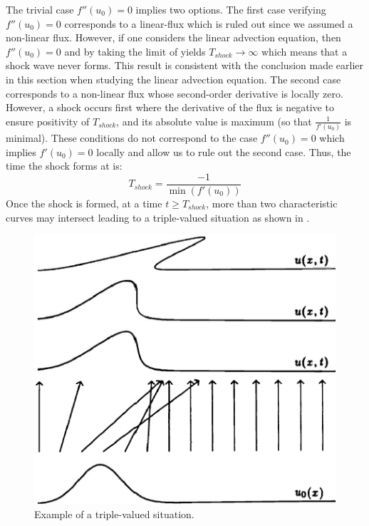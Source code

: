 The trivial case $f''(u_0) = 0$ implies two options. The first case verifying $f''(u_0) = 0$ corresponds to a linear-flux which is ruled out since we assumed a non-linear flux. However, if one considers the linear advection equation, then $f''(u_0)=0$ and by taking the limit of  yields $T_{shock} \to \infty$ which means that a shock wave never forms. This result is consistent with the conclusion made earlier in this section when studying the linear advection equation. The second case corresponds to a non-linear flux whose second-order derivative is locally zero. However, a shock occurs first where the derivative of the flux is negative to ensure positivity of $T_{shock}$, and its absolute value is maximum (so that $\frac{1}{f'(u_0)}$ is minimal). These conditions do not correspond to the case $f''(u_0) = 0$ which implies $f'(u_0) = 0$ locally  and allow us to rule out the second case. Thus, the time the shock forms at is:
%
\begin{equation}
T_{shock} = \frac{-1}{\min\left( f'(u_0) \right)} 
\end{equation}
% 
  
Once the shock is formed, at a time $t \geq T_{shock}$, more than two characteristic curves may intersect leading to a triple-valued situation as shown in . 
%
\begin{figure}[H]
\centering
\includegraphics[width=\textwidth]{figures/charact_curves_burger.png}
\caption{Example of a triple-valued situation.}
\label{fig:triple_pt_bg_sct1b}
\end{figure}
